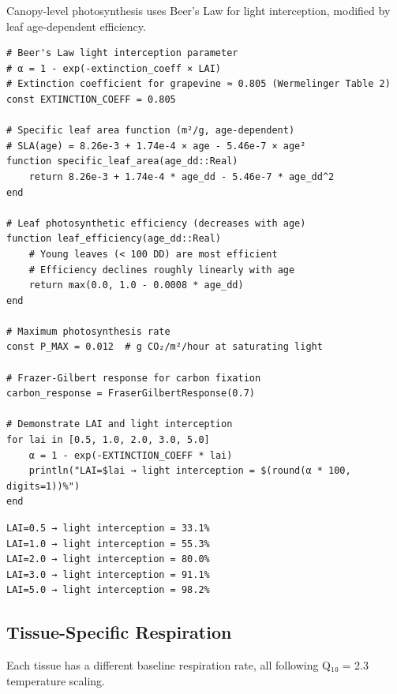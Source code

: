 \label{17555622561336708132}{}


Canopy-level photosynthesis uses Beer’s Law for light interception, modified by leaf age-dependent efficiency.




\begin{verbatim}
# Beer's Law light interception parameter
# α = 1 - exp(-extinction_coeff × LAI)
# Extinction coefficient for grapevine ≈ 0.805 (Wermelinger Table 2)
const EXTINCTION_COEFF = 0.805

# Specific leaf area function (m²/g, age-dependent)
# SLA(age) = 8.26e-3 + 1.74e-4 × age - 5.46e-7 × age²
function specific_leaf_area(age_dd::Real)
    return 8.26e-3 + 1.74e-4 * age_dd - 5.46e-7 * age_dd^2
end

# Leaf photosynthetic efficiency (decreases with age)
function leaf_efficiency(age_dd::Real)
    # Young leaves (< 100 DD) are most efficient
    # Efficiency declines roughly linearly with age
    return max(0.0, 1.0 - 0.0008 * age_dd)
end

# Maximum photosynthesis rate
const P_MAX = 0.012  # g CO₂/m²/hour at saturating light

# Frazer-Gilbert response for carbon fixation
carbon_response = FraserGilbertResponse(0.7)

# Demonstrate LAI and light interception
for lai in [0.5, 1.0, 2.0, 3.0, 5.0]
    α = 1 - exp(-EXTINCTION_COEFF * lai)
    println("LAI=$lai → light interception = $(round(α * 100, digits=1))%")
end
\end{verbatim}




\begin{verbatim}
LAI=0.5 → light interception = 33.1%
LAI=1.0 → light interception = 55.3%
LAI=2.0 → light interception = 80.0%
LAI=3.0 → light interception = 91.1%
LAI=5.0 → light interception = 98.2%
\end{verbatim}



\subsection{Tissue-Specific Respiration}



\label{1369639858547539123}{}


Each tissue has a different baseline respiration rate, all following Q₁₀ = 2.3 temperature scaling.




